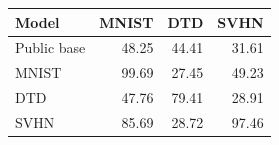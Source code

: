 \begin{tabular}{lrrr}
\toprule
Model & MNIST & DTD & SVHN \\
\midrule
Public base & 48.25 & 44.41 & 31.61 \\
MNIST & 99.69 & 27.45 & 49.23 \\
DTD & 47.76 & 79.41 & 28.91 \\
SVHN & 85.69 & 28.72 & 97.46 \\
\bottomrule
\end{tabular}

